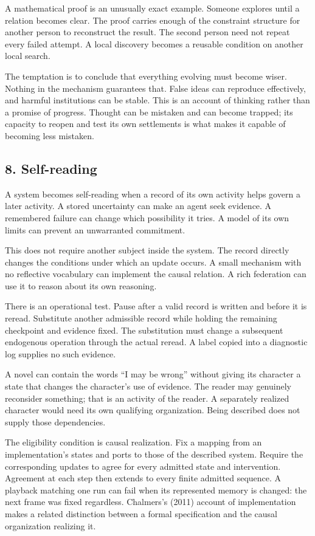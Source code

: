 \documentclass[
  11pt,
]{article}
\begin{document}
A mathematical proof is an unusually exact example. Someone explores
until a relation becomes clear. The proof carries enough of the
constraint structure for another person to reconstruct the result. The
second person need not repeat every failed attempt. A local discovery
becomes a reusable condition on another local search.

The temptation is to conclude that everything evolving must become
wiser. Nothing in the mechanism guarantees that. False ideas can
reproduce effectively, and harmful institutions can be stable. This is
an account of thinking rather than a promise of progress. Thought can be
mistaken and can become trapped; its capacity to reopen and test its own
settlements is what makes it capable of becoming less mistaken.

\subsection{8. Self-reading}\label{self-reading}

A system becomes self-reading when a record of its own activity helps
govern a later activity. A stored uncertainty can make an agent seek
evidence. A remembered failure can change which possibility it tries. A
model of its own limits can prevent an unwarranted commitment.

This does not require another subject inside the system. The record
directly changes the conditions under which an update occurs. A small
mechanism with no reflective vocabulary can implement the causal
relation. A rich federation can use it to reason about its own
reasoning.

There is an operational test. Pause after a valid record is written and
before it is reread. Substitute another admissible record while holding
the remaining checkpoint and evidence fixed. The substitution must
change a subsequent endogenous operation through the actual reread. A
label copied into a diagnostic log supplies no such evidence.

A novel can contain the words ``I may be wrong'' without giving its
character a state that changes the character's use of evidence. The
reader may genuinely reconsider something; that is an activity of the
reader. A separately realized character would need its own qualifying
organization. Being described does not supply those dependencies.

The eligibility condition is causal realization. Fix a mapping from an
implementation's states and ports to those of the described system.
Require the corresponding updates to agree for every admitted state and
intervention. Agreement at each step then extends to every finite
admitted sequence. A playback matching one run can fail when its
represented memory is changed: the next frame was fixed regardless.
Chalmers's (2011) account of implementation makes a related distinction
between a formal specification and the causal organization realizing it.
\end{document}
